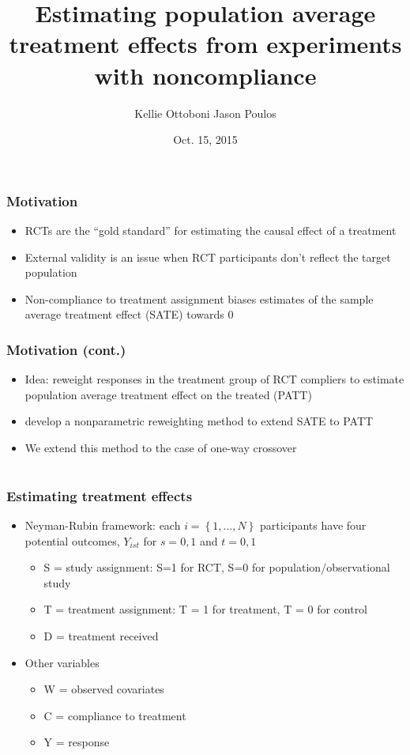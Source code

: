 \documentclass{beamer}
\title[]{Estimating population average treatment effects from experiments with noncompliance}
\author[K. Ottoboni, J. Poulos]{Kellie Ottoboni \hspace{10mm} Jason Poulos}
\date[10/15/15]{Oct. 15, 2015}
\begin{document}
\frame{\titlepage}

\section[Introduction]{}

\begin{frame}
\frametitle{Motivation}
\begin{itemize}
\item RCTs are the ``gold standard'' for estimating the causal effect of a treatment
\item External validity is an issue when RCT participants don't reflect the target population
\item Non-compliance to treatment assignment biases estimates of the sample average treatment effect (SATE) towards $0$
\end{itemize}
\end{frame}

\begin{frame}
\frametitle{Motivation (cont.)}
\begin{itemize}
\item Idea: reweight responses in the treatment group of RCT compliers to estimate population average treatment effect on the treated (PATT)
\item \cite{Hartman} develop a nonparametric reweighting method to extend SATE to PATT
\item We extend this method to the case of one-way crossover
\end{itemize}
\end{frame}

\section[Estimation]{}

\begin{frame}
\frametitle{Estimating treatment effects}
\begin{itemize}
\item Neyman-Rubin framework: each $i = \left\{1, ..., N \right\}$ participants have four potential outcomes, $Y_{ist}$ for $s = 0,1$ and $t = 0,1$
\begin{itemize}
\item S = study assignment: S=1 for RCT, S=0 for population/observational study
\item T = treatment assignment: T = 1 for treatment, T = 0 for control
\item D = treatment received
\end{itemize}
\item Other variables
\begin{itemize}
\item W = observed covariates
\item C = compliance to treatment
\item Y = response
\end{itemize}
\end{itemize}
\end{frame}
\end{document}
